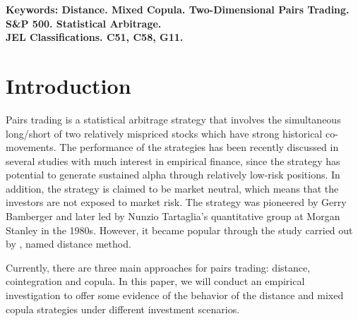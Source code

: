 \documentclass[a4paper,12pt]{report}
\begin{document}
\begin{refsection}
	\noindent \bf Keywords: \rm Distance. Mixed Copula. Two-Dimensional Pairs Trading. S\&P 500. Statistical Arbitrage.\\[.1in]
	\noindent \bf JEL Classifications. \rm C51, C58, G11.
	\clearpage
	
	\setlength{\baselineskip}{12pt}
	
	\setcounter{footnote}{0}
	\clearpage
	
		\section{Introduction}
	Pairs trading is a statistical arbitrage strategy that involves the simultaneous long/short of two relatively mispriced stocks which have strong historical co-movements. The performance of the strategies has been recently discussed in several studies with much interest in empirical finance, since the strategy has potential to generate sustained alpha through relatively low-risk positions. In addition, the strategy is claimed to be market neutral, which means that the investors are not exposed to market risk. The strategy was pioneered by Gerry Bamberger and later led by Nunzio Tartaglia's quantitative group at Morgan Stanley in the 1980s. However, it became popular through the study carried out by \citet*{ggr06}, named distance method.
	
	Currently, there are three main approaches for pairs trading: distance, cointegration and copula. In this paper, we will conduct an empirical investigation to offer some evidence of the behavior of the distance and mixed copula strategies under different investment scenarios. 
	

\end{refsection}
\end{document}

